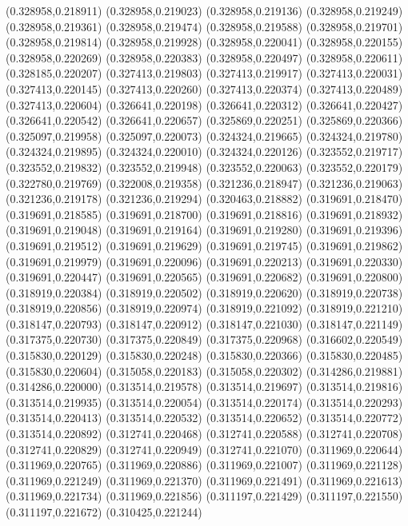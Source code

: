 (0.328958,0.218911)
(0.328958,0.219023)
(0.328958,0.219136)
(0.328958,0.219249)
(0.328958,0.219361)
(0.328958,0.219474)
(0.328958,0.219588)
(0.328958,0.219701)
(0.328958,0.219814)
(0.328958,0.219928)
(0.328958,0.220041)
(0.328958,0.220155)
(0.328958,0.220269)
(0.328958,0.220383)
(0.328958,0.220497)
(0.328958,0.220611)
(0.328185,0.220207)
(0.327413,0.219803)
(0.327413,0.219917)
(0.327413,0.220031)
(0.327413,0.220145)
(0.327413,0.220260)
(0.327413,0.220374)
(0.327413,0.220489)
(0.327413,0.220604)
(0.326641,0.220198)
(0.326641,0.220312)
(0.326641,0.220427)
(0.326641,0.220542)
(0.326641,0.220657)
(0.325869,0.220251)
(0.325869,0.220366)
(0.325097,0.219958)
(0.325097,0.220073)
(0.324324,0.219665)
(0.324324,0.219780)
(0.324324,0.219895)
(0.324324,0.220010)
(0.324324,0.220126)
(0.323552,0.219717)
(0.323552,0.219832)
(0.323552,0.219948)
(0.323552,0.220063)
(0.323552,0.220179)
(0.322780,0.219769)
(0.322008,0.219358)
(0.321236,0.218947)
(0.321236,0.219063)
(0.321236,0.219178)
(0.321236,0.219294)
(0.320463,0.218882)
(0.319691,0.218470)
(0.319691,0.218585)
(0.319691,0.218700)
(0.319691,0.218816)
(0.319691,0.218932)
(0.319691,0.219048)
(0.319691,0.219164)
(0.319691,0.219280)
(0.319691,0.219396)
(0.319691,0.219512)
(0.319691,0.219629)
(0.319691,0.219745)
(0.319691,0.219862)
(0.319691,0.219979)
(0.319691,0.220096)
(0.319691,0.220213)
(0.319691,0.220330)
(0.319691,0.220447)
(0.319691,0.220565)
(0.319691,0.220682)
(0.319691,0.220800)
(0.318919,0.220384)
(0.318919,0.220502)
(0.318919,0.220620)
(0.318919,0.220738)
(0.318919,0.220856)
(0.318919,0.220974)
(0.318919,0.221092)
(0.318919,0.221210)
(0.318147,0.220793)
(0.318147,0.220912)
(0.318147,0.221030)
(0.318147,0.221149)
(0.317375,0.220730)
(0.317375,0.220849)
(0.317375,0.220968)
(0.316602,0.220549)
(0.315830,0.220129)
(0.315830,0.220248)
(0.315830,0.220366)
(0.315830,0.220485)
(0.315830,0.220604)
(0.315058,0.220183)
(0.315058,0.220302)
(0.314286,0.219881)
(0.314286,0.220000)
(0.313514,0.219578)
(0.313514,0.219697)
(0.313514,0.219816)
(0.313514,0.219935)
(0.313514,0.220054)
(0.313514,0.220174)
(0.313514,0.220293)
(0.313514,0.220413)
(0.313514,0.220532)
(0.313514,0.220652)
(0.313514,0.220772)
(0.313514,0.220892)
(0.312741,0.220468)
(0.312741,0.220588)
(0.312741,0.220708)
(0.312741,0.220829)
(0.312741,0.220949)
(0.312741,0.221070)
(0.311969,0.220644)
(0.311969,0.220765)
(0.311969,0.220886)
(0.311969,0.221007)
(0.311969,0.221128)
(0.311969,0.221249)
(0.311969,0.221370)
(0.311969,0.221491)
(0.311969,0.221613)
(0.311969,0.221734)
(0.311969,0.221856)
(0.311197,0.221429)
(0.311197,0.221550)
(0.311197,0.221672)
(0.310425,0.221244)
